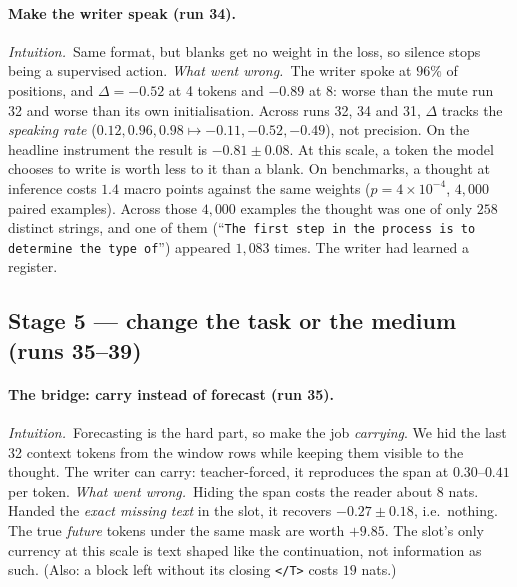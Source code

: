 \documentclass[11pt]{article}
\newcommand{\tend}{\texttt{</T>}}
\newcommand{\why}{\emph{Intuition.}\ }
\newcommand{\fail}{\emph{What went wrong.}\ }
\begin{document}
\paragraph{Make the writer speak (run 34).}
\why Same format, but blanks get no weight in the loss, so silence stops being a supervised action.
\fail The writer spoke at $96\%$ of positions, and $\Delta=-0.52$ at 4 tokens and $-0.89$ at 8: worse than the mute run 32 and worse than its own initialisation. Across runs 32, 34 and 31, $\Delta$ tracks the \emph{speaking rate} ($0.12,0.96,0.98\mapsto-0.11,-0.52,-0.49$), not precision. On the headline instrument the result is $-0.81\pm0.08$. At this scale, a token the model chooses to write is worth less to it than a blank. On benchmarks, a thought at inference costs $1.4$ macro points against the same weights ($p=4\times10^{-4}$, $4{,}000$ paired examples). Across those $4{,}000$ examples the thought was one of only $258$ distinct strings, and one of them (``\texttt{The first step in the process is to determine the type of}'') appeared $1{,}083$ times. The writer had learned a register.

\subsection*{Stage 5 --- change the task or the medium (runs 35--39)}

\paragraph{The bridge: carry instead of forecast (run 35).}
\why Forecasting is the hard part, so make the job \emph{carrying}. We hid the last 32 context tokens from the window rows while keeping them visible to the thought. The writer can carry: teacher-forced, it reproduces the span at $0.30$--$0.41$ per token.
\fail Hiding the span costs the reader about $8$ nats. Handed the \emph{exact missing text} in the slot, it recovers $-0.27\pm0.18$, i.e.\ nothing. The true \emph{future} tokens under the same mask are worth $+9.85$. The slot's only currency at this scale is text shaped like the continuation, not information as such. (Also: a block left without its closing \tend{} costs $19$ nats.)
\end{document}
